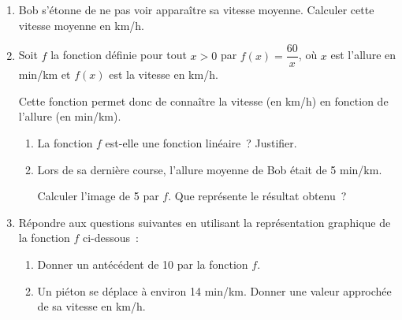 \documentclass[exercice,a4]{thedocument}%
\begin{document}
\begin{enumerate}
    \item Bob s'étonne de ne pas voir apparaître sa vitesse moyenne. Calculer
    cette vitesse moyenne en km/h.
    \item Soit $f$ la fonction définie pour tout $x>0$ par $f(x)=\dfrac{60}x$,
    où $x$ est l'allure en min/km et $f(x)$ est la vitesse en km/h.\par\noindent 
    Cette fonction permet donc de connaître la vitesse (en km/h) en fonction de
    l'allure (en min/km).
    \begin{enumerate}
        \item La fonction $f$ est-elle une fonction linéaire~? Justifier.
        \item Lors de sa dernière course, l'allure moyenne de Bob était de 5 min/km.\par\noindent
        Calculer l'image de 5 par $f$. Que représente le résultat obtenu~?
    \end{enumerate}
    \item Répondre aux questions suivantes en utilisant la représentation
    graphique de la fonction $f$ ci-dessous~:
    \begin{enumerate}
        \item Donner un antécédent de 10 par la fonction $f$.
        \item Un piéton se déplace à environ 14 min/km. Donner une valeur
        approchée de sa vitesse en km/h.\medskip\par\noindent
        \par
    \end{enumerate}
\end{enumerate}
\showthesource
\end{document}
